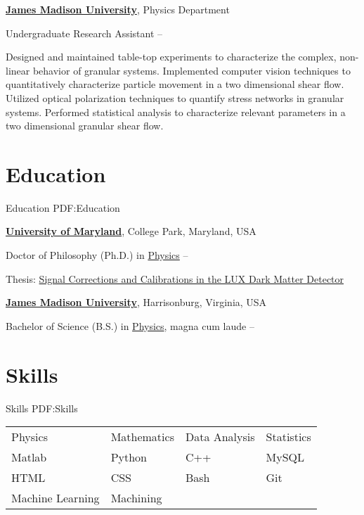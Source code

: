 \documentclass[letterpaper,MMMyyyy,nonstop]{simpleresumecv}
\begin{document}
\begin{body}
\BigGap
\href{http://csma31.csm.jmu.edu/physics/}
{\textbf{James Madison University}},
Physics Department

\GapNoBreak
\BulletItem
Undergraduate Research Assistant
\hfill
{} --
\begin{detail}
\SubBulletItem
Designed and maintained table-top experiments to characterize the complex, non-linear behavior of granular systems.
\SubBulletItem
Implemented computer vision techniques to quantitatively characterize particle movement in a two dimensional shear flow.
\SubBulletItem
Utilized optical polarization techniques to quantify stress networks in granular systems.
\SubBulletItem
Performed statistical analysis to characterize relevant parameters in a two dimensional granular shear flow.
\end{detail}


\section
{Education}
{Education}
{PDF:Education}

\href{http://umd.edu/}
{\textbf{University of Maryland}},
College Park, Maryland, USA

\GapNoBreak
\BulletItem
Doctor of Philosophy (Ph.D.) in
\href{http://umdphysics.umd.edu/}
{Physics}
\hfill
{}--
\begin{detail}
\SubBulletItem
Thesis:
\href{http://updatethis}
{Signal Corrections and Calibrations in the LUX Dark Matter Detector}
\end{detail}


\BigGap
\href{http://www.jmu.edu/}
{\textbf{James Madison University}},
Harrisonburg, Virginia, USA

\GapNoBreak
\BulletItem
Bachelor of Science (B.S.) in
\href{http://csma31.csm.jmu.edu/physics/}
{Physics}, magna cum laude
\hfill
{} --


\section
{Skills}
{Skills}
{PDF:Skills}

\Gap
\begin{tabular}{llll}
Physics & Mathematics & Data Analysis & Statistics\\
Matlab & Python & C++ & MySQL\\
HTML & CSS & Bash & Git \\
Machine Learning & Machining & 
\end{tabular}


\end{body}
\end{document}
